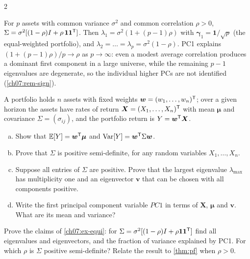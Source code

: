 \begin{paracol}{2}
\begin{example}\label{ch07:ex-equi}
For $p$ assets with common variance $\sigma^2$ and common correlation $\rho>0$,
$\Sigma=\sigma^2[(1-\rho)I+\rho\,\bm 1\bm 1^{\mathsf T}]$. Then $\lambda_1=\sigma^2(1+(p-1)\rho)$ with $\bm\gamma_1=\bm1/\sqrt p$ (the
equal-weighted portfolio), and $\lambda_2=\dots=\lambda_p=\sigma^2(1-\rho)$. PC1 explains
$(1+(p-1)\rho)/p\to\rho$ as $p\to\infty$: even a modest average correlation produces a dominant first
component in a large universe, while the remaining $p-1$ eigenvalues are degenerate, so the individual
higher PCs are not identified (\cref{ch07:rem-sign}).
\end{example}

\begin{exercise}\label{ch07:ex-ps2}
A portfolio holds $n$ assets with fixed weights $\bm w=(w_1,\dots,w_n)^{\mathsf T}$; over a given horizon the assets have
rates of return $\bm X=(X_1,\dots,X_n)^{\mathsf T}$ with mean $\bm\mu$ and covariance $\Sigma=(\sigma_{ij})$, and the portfolio return
is $Y=\bm w^{\mathsf T}\bm X$.
\begin{enumerate}[(a)]
  \item Show that $\mathbb{E}[Y]=\bm w^{\mathsf T}\bm\mu$ and $\operatorname{Var}[Y]=\bm w^{\mathsf T}\Sigma\bm w$.
  \item Prove that $\Sigma$ is positive semi-definite, for any random variables $X_1,\dots,X_n$.
  \item Suppose all entries of $\Sigma$ are positive. Prove that the largest eigenvalue $\lambda_{\max}$ has multiplicity one and
      an eigenvector $\bm v$ that can be chosen with all components positive.
  \item Write the first principal component variable $PC1$ in terms of $\bm X$, $\bm\mu$ and $\bm v$. What are its mean and
      variance?
\end{enumerate}
\end{exercise}

\begin{exercise}\label{ch07:ex-equi-proof}
Prove the claims of \cref{ch07:ex-equi}: for $\Sigma=\sigma^2[(1-\rho)I+\rho\bm1\bm1^{\mathsf T}]$ find all eigenvalues and eigenvectors, and
the fraction of variance explained by PC1. For which $\rho$ is $\Sigma$ positive semi-definite? Relate the result to
\cref{thm:pf} when $\rho>0$.
\end{exercise}


\end{paracol}
